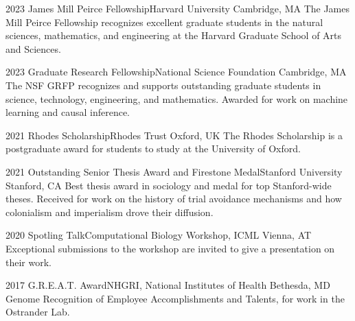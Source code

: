 

\begin{cvhonors}


    \cvhonor
    {2023}
    {James Mill Peirce Fellowship}{Harvard University}
    {Cambridge, MA}
    {The James Mill Peirce Fellowship recognizes excellent graduate students in the natural sciences, mathematics, and engineering at the Harvard Graduate School of Arts and Sciences.}

    \cvhonor
    {2023}
    {Graduate Research Fellowship}{National Science Foundation}
    {Cambridge, MA}
    {The NSF GRFP recognizes and supports outstanding graduate students in science, technology, engineering, and mathematics. Awarded for work on machine learning and causal inference.}

    \cvhonor
    {2021}
    {Rhodes Scholarship}{Rhodes Trust}
    {Oxford, UK}
    {The Rhodes Scholarship is a postgraduate award for students to study at the University of Oxford.}

    \cvhonor
    {2021}
    {Outstanding Senior Thesis Award and Firestone Medal}{Stanford University}
    {Stanford, CA}
    {Best thesis award in sociology and medal for top Stanford-wide theses. Received for work on the history of trial avoidance mechanisms and how colonialism and imperialism drove their diffusion.}

    \cvhonor
    {2020}
    {Spotling Talk}{Computational Biology Workshop, ICML}
    {Vienna, AT}
    {Exceptional submissions to the workshop are invited to give a presentation on their work.}

    \cvhonor
    {2017}
    {G.R.E.A.T. Award}{NHGRI, National Institutes of Health}
    {Bethesda, MD}
    {Genome Recognition of Employee Accomplishments and Talents, for work in the Ostrander Lab.}

\end{cvhonors}
